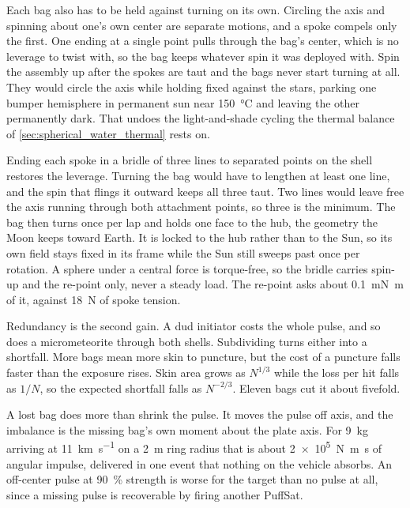 \documentclass{article}
\begin{document}
Each bag also has to be held against turning on its own. Circling the axis and spinning about one's own center are separate motions, and a spoke compels only the first. One ending at a single point pulls through the bag's center, which is no leverage to twist with, so the bag keeps whatever spin it was deployed with. Spin the assembly up after the spokes are taut and the bags never start turning at all. They would circle the axis while holding fixed against the stars, parking one bumper hemisphere in permanent sun near \SI{150}{\celsius} and leaving the other permanently dark. That undoes the light-and-shade cycling the thermal balance of \autoref{sec:spherical_water_thermal} rests on.

Ending each spoke in a bridle of three lines to separated points on the shell restores the leverage. Turning the bag would have to lengthen at least one line, and the spin that flings it outward keeps all three taut. Two lines would leave free the axis running through both attachment points, so three is the minimum. The bag then turns once per lap and holds one face to the hub, the geometry the Moon keeps toward Earth. It is locked to the hub rather than to the Sun, so its own field stays fixed in its frame while the Sun still sweeps past once per rotation. A sphere under a central force is torque-free, so the bridle carries spin-up and the re-point only, never a steady load. The re-point asks about \SI{0.1}{\milli\newton\meter} of it, against \SI{18}{\newton} of spoke tension.

Redundancy is the second gain. A dud initiator costs the whole pulse, and so does a micrometeorite through both shells. Subdividing turns either into a shortfall. More bags mean more skin to puncture, but the cost of a puncture falls faster than the exposure rises. Skin area grows as $N^{1/3}$ while the loss per hit falls as $1/N$, so the expected shortfall falls as $N^{-2/3}$. Eleven bags cut it about fivefold.

A lost bag does more than shrink the pulse. It moves the pulse off axis, and the imbalance is the missing bag's own moment about the plate axis. For \SI{9}{\kilo\gram} arriving at \SI{11}{\kilo\meter\per\second} on a \SI{2}{\meter} ring radius that is about \SI{2e5}{\newton\meter\second} of angular impulse, delivered in one event that nothing on the vehicle absorbs. An off-center pulse at \SI{90}{\percent} strength is worse for the target than no pulse at all, since a missing pulse is recoverable by firing another PuffSat.
\end{document}
